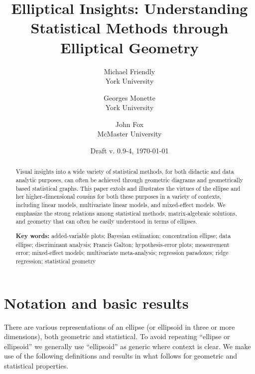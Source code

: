 \documentclass[11pt]{article}%
\newcommand{\keywords}[1]{\par\noindent\textbf{Key words:} #1}
\begin{document}
\begin{titlepage}
\title{Elliptical Insights: Understanding Statistical Methods through Elliptical Geometry}

\author{Michael Friendly%
 \\ York University
\and
Georges Monette \\ York University
\and
John Fox \\ McMaster University
}
\date{Draft v. 0.9-4, \today}
\end{titlepage}
\maketitle

\begin{abstract}
Visual insights into  a wide variety  of statistical methods,  for both didactic
and data analytic purposes, can often be achieved through geometric diagrams  and
geometrically based statistical graphs.  This  paper extols and illustrates  the
virtues  of  the  ellipse  and her  higher-dimensional  cousins  for  both these
purposes in a variety of contexts, including linear models, multivariate
linear models, and mixed-effect models.
We emphasize the strong relations among statistical methods, matrix-algebraic
solutions, and geometry that can often be easily understood in terms of
ellipses.

\keywords{
added-variable plots;
Bayesian estimation;
concentration ellipse;
data ellipse;
discriminant analysis;
Francis Galton;
hypothesis-error plots;
measurement error;
mixed-effect models;
multivariate meta-analysis;
regression paradoxes;
ridge regression;
statistical geometry
}
\end{abstract}



\section{Notation and basic results}

There are various representations of an ellipse (or ellipsoid in three or more dimensions),
both geometric and statistical.
To avoid repeating ``ellipse or ellipsoid'' we generally use ``ellipsoid'' as generic where context is clear.
We make use of the following definitions and results in what follows for geometric and
statistical properties.
\end{document}
